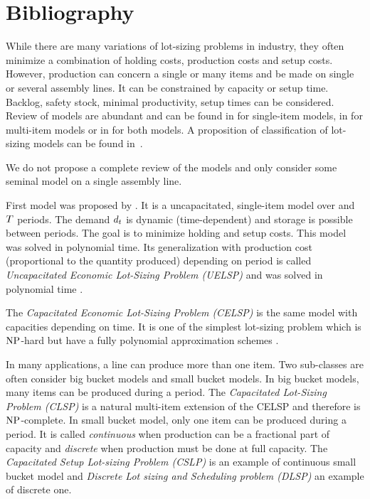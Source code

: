 \section{Bibliography}
\label{sec:PDP:deterministic:bibliography}

While there are many variations of lot-sizing problems in industry, they often minimize a combination of holding costs, production costs and setup costs.
However, production can concern a single or many items and be made on single or several assembly lines.
It can be constrained by capacity or setup time.
Backlog, safety stock, minimal productivity, setup times can be considered.
Review of models are abundant and can be found in \cite{Geunes2014} for single-item models, in \cite{Gicquel2008} for multi-item models or in \cite{Karimi2003} for both models. A proposition of classification of lot-sizing models can be found in~\cite[Chapter 4 and 12]{Pochet2006}.

We do not propose a complete review of the models and only consider some seminal model on a single assembly line.

\medskip

First model was proposed by \cite{Wagner1958}. It is a uncapacitated, single-item model over and $T$ periods. The demand $d_t$ is dynamic (\ie time-dependent) and storage is possible between periods. The goal is to minimize holding and setup costs. This model was solved in polynomial time.
Its generalization with production cost (proportional to the quantity produced) depending on period is called \emph{Uncapacitated Economic Lot-Sizing Problem (UELSP)} and was solved in polynomial time \cite{Federgruen1991,Wagelmans1992,Aggarwal1993}.


The \emph{Capacitated Economic Lot-Sizing Problem (CELSP)} is the same model with capacities depending on time. It is one of the simplest lot-sizing problem which is $\operatorname{NP}$-hard \cite{Florian1980} but have a fully polynomial approximation schemes \cite{vanHoesel2001}.

\medskip

In many applications, a line can produce more than one item. Two sub-classes are often consider big bucket models and small bucket models.
In big bucket models, many items can be produced during a period.
The \emph{Capacitated Lot-Sizing Problem (CLSP)} is a natural multi-item extension of the CELSP and therefore is $\operatorname{NP}$-complete.
In small bucket model, only one item can be produced during a period. It is called \emph{continuous} when production can be a fractional part of capacity and \emph{discrete} when production must be done at full capacity. The \emph{Capacitated Setup Lot-sizing Problem (CSLP)} is an example of continuous small bucket model and \emph{Discrete Lot sizing and Scheduling problem (DLSP)} an example of discrete one.


